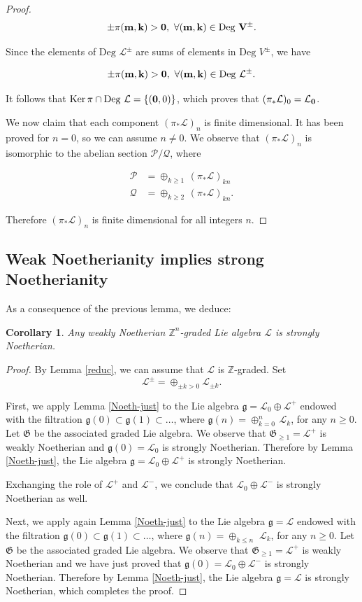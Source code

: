 \documentclass[11pt, letterpaper, reqno]{amsart}
\newtheorem{cor}[theorem]{Corollary}
\theoremstyle{definition}
\newcommand{\Z}{{\mathbb Z}}
\newcommand{\cL}{\mathcal L}
\newcommand{\cP}{\mathcal P}
\newcommand{\cQ}{\mathcal Q}
\newcommand{\fg}{\mathfrak{g}}
\newcommand{\fG}{\mathfrak{G}}
\newcommand{\Deg}{\mathrm{Deg\,}}
\newcommand{\Ker}{\operatorname{Ker}}
\begin{document}
\begin{proof}
$$\pm\pi(\bf m,k)>0, \,\,\forall
(\bf m,k)\in \Deg\,V^\pm.$$

\noindent Since the elements of $\Deg\,\cL^\pm$
are sums of elements in $\Deg\,V^\pm$, we have

$$\pm\pi(\bf m,k)>0,\,\,\forall
(\bf m,k)\in \Deg\,\cL^\pm.$$

\noindent It follows that
$\Ker\pi\cap \Deg\,\cL=\{({\bf 0},0)\}$,
which proves that $(\pi_*\cL)_0=\cL_{\bf 0}$.

We now claim that each component 
$(\pi_*\cL)_n$ is finite dimensional.
It has been proved for $n=0$, so we can assume
$n\neq 0$. We observe that 
$(\pi_*\cL)_n$ is isomorphic to the abelian section 
$\cP/\cQ$, where

\begin{align*}
\cP&=\oplus_{k{\geq 1}}\, (\pi_*\cL)_{kn}\\
\cQ&=\oplus_{k{\geq 2}}\, (\pi_*\cL)_{kn}.
\end{align*}

\noindent Therefore $(\pi_*\cL)_n$ is finite dimensional for all integers $n$.
\end{proof}


\subsection{Weak Noetherianity implies strong Noetherianity} As a consequence of the previous lemma, we deduce:
\begin{cor}\label{strongNoeth}
Any weakly Noetherian $\Z^n$-graded Lie algebra
$\cL$ is strongly Noetherian.
\end{cor}

\begin{proof} By Lemma \ref{reduc}, we can assume that $\cL$ is $\Z$-graded. Set 
$$\cL^\pm=\oplus_{\pm k>0}\cL_{\pm k}.$$

First, we apply Lemma \ref{Noeth-just} to the Lie algebra $\fg=\cL_0\oplus\cL^+$ endowed with the filtration $\fg(0)\subset\fg(1)\subset\ldots$, where $\fg(n)=\oplus_{k=0}^n\,\cL_k$, for any $n\geq 0$. Let $\fG$ be the associated graded Lie algebra. We observe that $\fG_{\geq 1}= \cL^+$ is weakly Noetherian and $\fg(0)=\cL_0$
is strongly Noetherian. Therefore by Lemma 
\ref{Noeth-just}, the Lie algebra $\fg=\cL_0\oplus\cL^+$ is strongly Noetherian.

Exchanging the role of $\cL^+$ and $\cL^-$, we conclude that $\cL_0\oplus\cL^-$ is strongly Noetherian as well.

 Next, we apply again Lemma \ref{Noeth-just} to the Lie algebra $\fg=\cL$ endowed with the filtration $\fg(0)\subset\fg(1)\subset\ldots$, where $\fg(n)=\oplus_{k\leq n}\,\,\cL_k$, for any $n\geq 0$. Let $\fG$ be the associated graded Lie algebra. We observe that $\fG_{\geq 1}= \cL^+$ is weakly Noetherian and we have just proved that 
 $\fg(0)=\cL_0\oplus \cL^-$
is strongly Noetherian. Therefore by Lemma 
\ref{Noeth-just}, the Lie algebra $\fg=\cL$ is strongly Noetherian, which completes the proof.
\end{proof}
\end{document}
